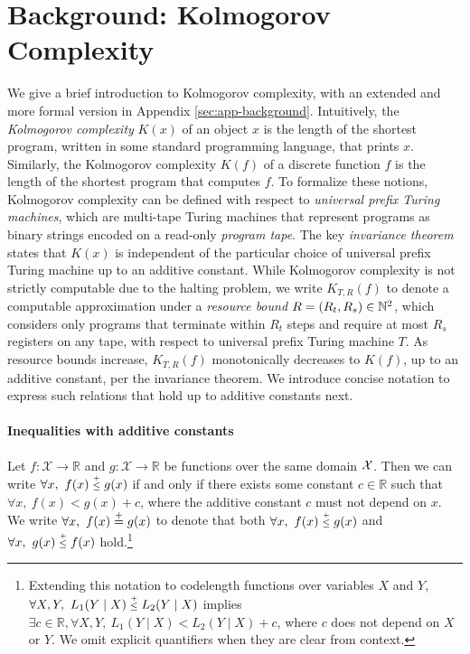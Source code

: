 \vspace{-0.1cm}
\section{Background: Kolmogorov Complexity}
\label{sec:background}
\vspace{-0.1cm}

We give a brief introduction to Kolmogorov complexity, with an extended and more formal version in Appendix \ref{sec:app-background}. 
 Intuitively, the \emph{Kolmogorov complexity} $K(x)$ of an object $x$ is the length of the shortest program, written in some standard programming language, that prints $x$. Similarly, the Kolmogorov complexity $K(f)$ of a discrete function $f$ is the length of the shortest program that computes $f$. To formalize these notions, Kolmogorov complexity can be defined with respect to \emph{universal prefix Turing machines}, which are multi-tape Turing machines that represent programs as binary strings encoded on a read-only \emph{program tape}. The key \emph{invariance theorem} states that $K(x)$ is independent of the particular choice of universal prefix Turing machine up to an additive constant. %
 While Kolmogorov complexity is not strictly computable due to the halting problem, we write $K_{T,R}(f)$ to denote a computable approximation under a \emph{resource bound} $R = (R_t, R_s) \in \mathbb{N}^2$, which considers only programs that terminate within $R_t$ steps and require at most $R_s$ registers on any tape, with respect to universal prefix Turing machine $T$. As resource bounds increase, $K_{T,R}(f)$ monotonically decreases to $K(f)$, up to an additive constant, per the invariance theorem. We introduce concise notation to express such relations that hold up to additive constants next.

\vspace{-0.1cm}
\paragraph{Inequalities with additive constants} Let $f: \mathcal{X} \to \mathbb{R}$ and $g: \mathcal{X} \to \mathbb{R}$ be functions over the same domain ${\mathcal{X}}$. Then we can write $\forall x,~f(x) \leqc g(x)$ if and only if there exists some constant $c\in \mathbb{R}$ such that $\forall x,~f(x) < g(x) + c$, where the additive constant $c$ must not depend on $x$. We write $\forall x,~f(x) \stackrel{+}{=} g(x)$ to denote that both
$\forall x,~f(x) \leqc g(x)$ and $\forall x,~g(x) \leqc f(x)$ hold.\footnote{Extending this notation to codelength functions over variables $X$ and $Y$, $\forall X,Y,~L_1(Y \mid X) \leqc L_2(Y \mid X)$ implies $\exists c \in \mathbb{R},\forall X,Y,~L_1(Y \mid X) < L_2(Y \mid X) + c$, where $c$ does not depend on $X$ or $Y$. We omit explicit quantifiers when they are clear from context.}

